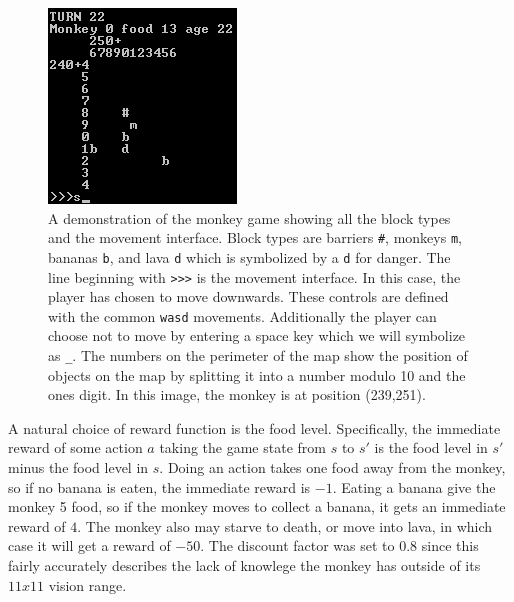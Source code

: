 \documentclass[%
 reprint,
nofootinbib,
 amsmath,amssymb,
 aps,
]{revtex4-1}
\begin{document}
\begin{figure}
  \includegraphics[width=0.8\columnwidth]{GameDemo}
  \caption{A demonstration of the monkey game showing all the block types and the movement interface. Block types are barriers \texttt{\#}, monkeys \texttt{m}, bananas \texttt{b}, and lava \texttt{d} which is symbolized by a \texttt{d} for danger. The line beginning with \texttt{>>>} is the movement interface. In this case, the player has chosen to move downwards. These controls are defined with the common \texttt{wasd} movements. Additionally the player can choose not to move by entering a space key which we will symbolize as \texttt{\_}. The numbers on the perimeter of the map show the position of objects on the map by splitting it into a number modulo 10 and the ones digit. In this image, the monkey is at position (239,251).} \label{fig:GameDemo}
\end{figure}

A natural choice of reward function is the food level. Specifically, the immediate reward of some action $a$ taking the game state from $s$ to $s'$ is the food level in $s'$ minus the food level in $s$. Doing an action takes one food away from the monkey, so if no banana is eaten, the immediate reward is $-1$. Eating a banana give the monkey 5 food, so if the monkey moves to collect a banana, it gets an immediate reward of $4$. The monkey also may starve to death, or move into lava, in which case it will get a reward of $-50$. The discount factor was set to $0.8$ since this fairly accurately describes the lack of knowlege the monkey has outside of its $11x11$ vision range.
\end{document}
